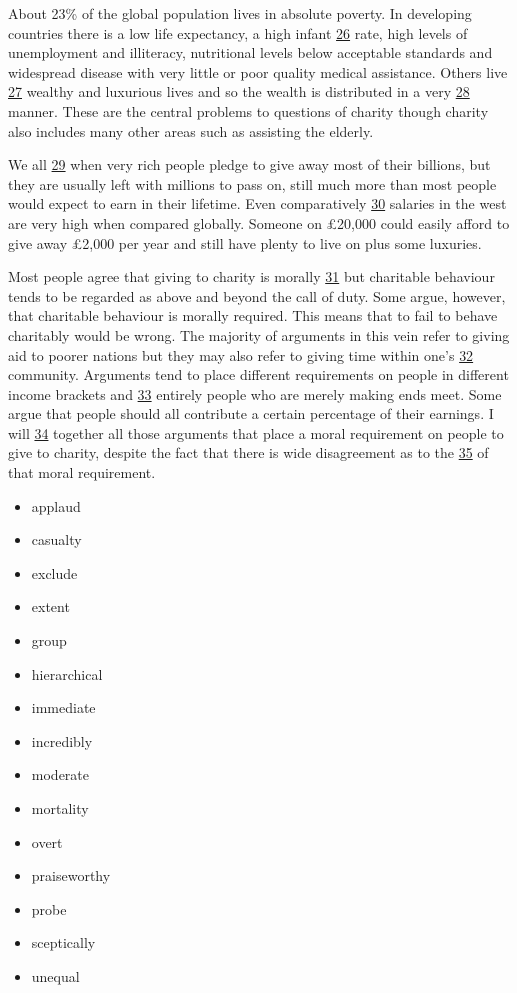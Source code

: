 \documentclass[UTF8,11pt]{ctexart}
\begin{document}
About 23\% of the global population lives in absolute poverty. In developing countries there is a low life expectancy, a high infant \uline{26} rate, high levels of unemployment and illiteracy, nutritional levels below acceptable standards and widespread disease with very little or poor quality medical assistance. Others live \uline{27} wealthy and luxurious lives and so the wealth is distributed in a very \uline{28} manner. These are the central problems to questions of charity though charity also includes many other areas such as assisting the elderly.


We all \uline{29} when very rich people pledge to give away most of their billions, but they are usually left with millions to pass on, still much more than most people would expect to earn in their lifetime. Even comparatively \uline{30} salaries in the west are very high when compared globally. Someone on £20,000 could easily afford to give away £2,000 per year and still have plenty to live on plus some luxuries.


Most people agree that giving to charity is morally \uline{31} but charitable behaviour tends to be regarded as above and beyond the call of duty. Some argue, however, that charitable behaviour is morally required. This means that to fail to behave charitably would be wrong. The majority of arguments in this vein refer to giving aid to poorer nations but they may also refer to giving time within one’s \uline{32} community. Arguments tend to place different requirements on people in different income brackets and \uline{33} entirely people who are merely making ends meet. Some argue that people should all contribute a certain percentage of their earnings. I will \uline{34} together all those arguments that place a moral requirement on people to give to charity, despite the fact that there is wide disagreement as to the \uline{35} of that moral requirement.


\begin{itemize}[leftmargin=2em,itemsep=.2em,topsep=.4em]\item[A.] applaud
\item[B.] casualty
\item[C.] exclude
\item[D.] extent
\item[E.] group
\item[F.] hierarchical
\item[G.] immediate
\item[H.] incredibly
\item[I.] moderate
\item[J.] mortality
\item[K.] overt
\item[L.] praiseworthy
\item[M.] probe
\item[N.] sceptically
\item[O.] unequal
\end{itemize}
\end{document}
